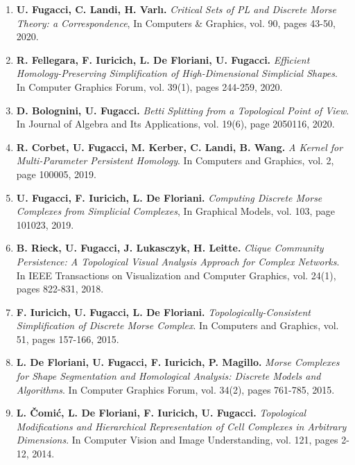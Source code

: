\documentclass[11pt]{article}
\begin{document}
\begin{enumerate}

\item {\bf U. Fugacci, C. Landi, H. Varl{\i}.} {\em Critical Sets of PL and Discrete Morse Theory: a Correspondence}, In Computers \& Graphics, vol. 90, pages 43-50, 2020.

\item {\bf R. Fellegara, F. Iuricich, L. De Floriani, U. Fugacci.} {\em Efficient Homology-Preserving Simplification of High-Dimensional Simplicial Shapes}. In Computer Graphics Forum, vol. 39(1), pages 244-259, 2020.

\item {\bf D. Bolognini, U. Fugacci.} {\em Betti Splitting from a Topological Point of View}. In Journal of Algebra and Its Applications, vol. 19(6), page 2050116, 2020.

\item {\bf R. Corbet, U. Fugacci, M. Kerber, C. Landi, B. Wang.} {\em A Kernel for Multi-Parameter Persistent Homology}. In Computers and Graphics, vol. 2, page 100005, 2019.

\item {\bf U. Fugacci, F. Iuricich, L. De Floriani.} {\em Computing Discrete Morse Complexes from Simplicial Complexes}, In Graphical Models, vol. 103, page 101023, 2019.

\item {\bf B. Rieck, U. Fugacci, J. Lukasczyk, H. Leitte.} {\em Clique Community Persistence: A Topological Visual Analysis Approach for Complex Networks}. In IEEE Transactions on Visualization and Computer Graphics, vol. 24(1), pages 822-831, 2018.

\item {\bf F. Iuricich, U. Fugacci, L. De Floriani.} {\em Topologically-Consistent Simplification of Discrete Morse Complex}. In Computers and Graphics, vol. 51, pages 157-166, 2015. %

\item {\bf L. De Floriani, U. Fugacci, F. Iuricich, P. Magillo.} {\em Morse Complexes for Shape Segmentation and Homological Analysis: Discrete Models and Algorithms}. In Computer Graphics Forum, vol. 34(2), pages 761-785, 2015.

\item {\bf L. {\v C}omi{\' c}, L. De Floriani, F. Iuricich, U. Fugacci.} {\em Topological Modifications and Hierarchical Representation of Cell Complexes in Arbitrary Dimensions}. In Computer Vision and Image Understanding, vol. 121, pages 2-12, 2014.

\end{enumerate}
\vspace*{1ex}
\end{document}
